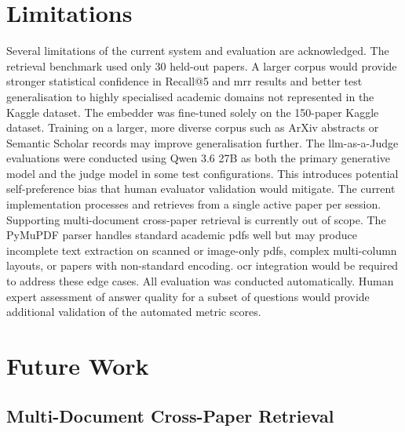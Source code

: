 \section{Limitations}

Several limitations of the current system and evaluation are acknowledged.
\newline \newline The retrieval benchmark used only 30 held-out papers. A larger corpus would provide stronger statistical confidence in Recall@5 and \gls{mrr} results and better test generalisation to highly specialised academic domains not represented in the Kaggle dataset.
\newline \newline The embedder was fine-tuned solely on the 150-paper Kaggle dataset. Training on a larger, more diverse corpus such as ArXiv abstracts or Semantic Scholar records may improve generalisation further.
\newline \newline The \gls{llm}-as-a-Judge evaluations were conducted using Qwen 3.6 27B as both the primary generative model and the judge model in some test configurations. This introduces potential self-preference bias that human evaluator validation would mitigate.
\newline \newline The current implementation processes and retrieves from a single active paper per session. Supporting multi-document cross-paper retrieval is currently out of scope.
\newline \newline The PyMuPDF parser handles standard academic \gls{pdf}s well but may produce incomplete text extraction on scanned or image-only \gls{pdf}s, complex multi-column layouts, or papers with non-standard encoding. \gls{ocr} integration would be required to address these edge cases.
\newline \newline All evaluation was conducted automatically. Human expert assessment of answer quality for a subset of questions would provide additional validation of the automated metric scores.

\section{Future Work}

\subsection{Multi-Document Cross-Paper Retrieval}

